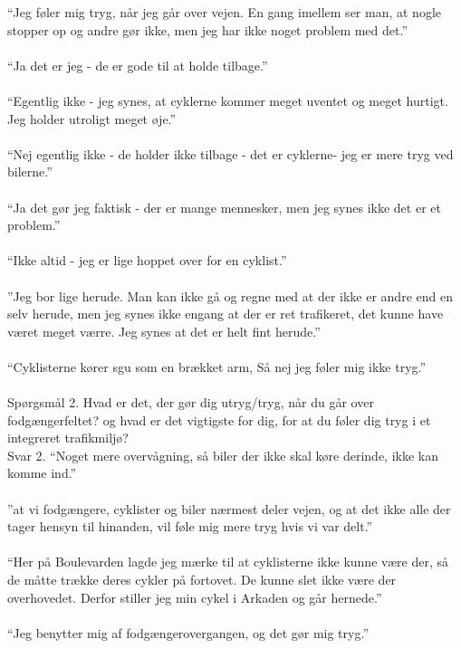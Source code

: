 \begin{appendics}
  “Jeg føler mig tryg, når jeg går over vejen. En gang imellem ser man, at nogle stopper op og andre gør ikke, men jeg har ikke noget problem med det.”
\\\\
  “Ja det er jeg - de er gode til at holde tilbage.”
\\\\
  “Egentlig ikke - jeg synes, at cyklerne kommer meget uventet og meget hurtigt. Jeg holder utroligt meget øje.”
\\\\
  “Nej egentlig ikke - de holder ikke tilbage - det er cyklerne- jeg er mere tryg ved bilerne.”
\\\\
  “Ja det gør jeg faktisk - der er mange mennesker, men jeg synes ikke det er et problem.”
\\\\
  “Ikke altid - jeg er lige hoppet over for en cyklist.”
\\\\
  ”Jeg bor lige herude. Man kan ikke gå og regne med at der ikke er andre end en selv herude, men jeg synes ikke engang at der er ret trafikeret, det kunne have været meget værre. Jeg synes at det er helt fint herude.”
\\\\
  “Cyklisterne kører sgu som en brækket arm, Så nej jeg føler mig ikke tryg.”
\\\\
  Spørgsmål 2.
  Hvad er det, der gør dig utryg/tryg, når du går over fodgængerfeltet? og hvad er det vigtigste for dig, for at du føler dig tryg i et integreret trafikmiljø?
  \\
   Svar 2.
  “Noget mere overvågning, så biler der ikke skal køre derinde, ikke kan komme ind.”
\\\\
  ”at vi fodgængere, cyklister og biler nærmest deler vejen, og at det ikke alle der tager hensyn til hinanden, vil føle mig mere tryg hvis vi var delt.”
\\\\
  “Her på Boulevarden lagde jeg mærke til at cyklisterne ikke kunne være der, så de måtte trække deres cykler på fortovet. De kunne slet ikke være der overhovedet.  Derfor stiller jeg min cykel i Arkaden og går hernede.”
\\\\
  “Jeg benytter mig af fodgængerovergangen, og det gør mig tryg.”
\\\\

\end{appendics}
